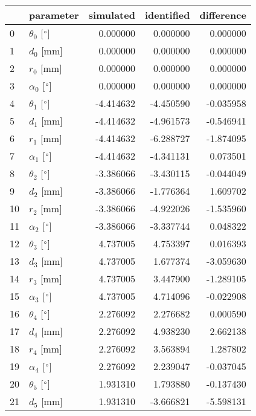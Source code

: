 \documentclass{standalone}%
\begin{document}
%
\normalsize%
\begin{tabular}{llrrr}
\toprule
{} &                 parameter & simulated & identified & difference \\
\midrule
0  &  $\theta_{0}$ [$\degree$] &  0.000000 &   0.000000 &   0.000000 \\
1  &              $d_{0}$ [mm] &  0.000000 &   0.000000 &   0.000000 \\
2  &              $r_{0}$ [mm] &  0.000000 &   0.000000 &   0.000000 \\
3  &  $\alpha_{0}$ [$\degree$] &  0.000000 &   0.000000 &   0.000000 \\
4  &  $\theta_{1}$ [$\degree$] & -4.414632 &  -4.450590 &  -0.035958 \\
5  &              $d_{1}$ [mm] & -4.414632 &  -4.961573 &  -0.546941 \\
6  &              $r_{1}$ [mm] & -4.414632 &  -6.288727 &  -1.874095 \\
7  &  $\alpha_{1}$ [$\degree$] & -4.414632 &  -4.341131 &   0.073501 \\
8  &  $\theta_{2}$ [$\degree$] & -3.386066 &  -3.430115 &  -0.044049 \\
9  &              $d_{2}$ [mm] & -3.386066 &  -1.776364 &   1.609702 \\
10 &              $r_{2}$ [mm] & -3.386066 &  -4.922026 &  -1.535960 \\
11 &  $\alpha_{2}$ [$\degree$] & -3.386066 &  -3.337744 &   0.048322 \\
12 &  $\theta_{3}$ [$\degree$] &  4.737005 &   4.753397 &   0.016393 \\
13 &              $d_{3}$ [mm] &  4.737005 &   1.677374 &  -3.059630 \\
14 &              $r_{3}$ [mm] &  4.737005 &   3.447900 &  -1.289105 \\
15 &  $\alpha_{3}$ [$\degree$] &  4.737005 &   4.714096 &  -0.022908 \\
16 &  $\theta_{4}$ [$\degree$] &  2.276092 &   2.276682 &   0.000590 \\
17 &              $d_{4}$ [mm] &  2.276092 &   4.938230 &   2.662138 \\
18 &              $r_{4}$ [mm] &  2.276092 &   3.563894 &   1.287802 \\
19 &  $\alpha_{4}$ [$\degree$] &  2.276092 &   2.239047 &  -0.037045 \\
20 &  $\theta_{5}$ [$\degree$] &  1.931310 &   1.793880 &  -0.137430 \\
21 &              $d_{5}$ [mm] &  1.931310 &  -3.666821 &  -5.598131 \\

\end{tabular}
\end{document}
